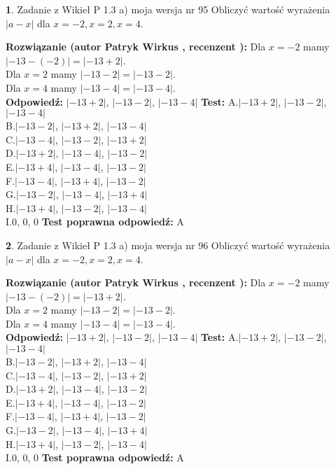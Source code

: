 \documentclass[12pt, a4paper]{article}
\theoremstyle{definition} %
\newtheorem{zad}{}
\newcommand{\zadStart}[1]{\begin{zad}#1\newline}
\newcommand{\zadStop}{\end{zad}}
\newcommand{\rozwStart}[2]{\noindent \textbf{Rozwiązanie (autor #1 , recenzent #2): }\newline}
\newcommand{\rozwStop}{\newline}
\newcommand{\odpStart}{\noindent \textbf{Odpowiedź:}\newline}
\newcommand{\odpStop}{\newline}
\newcommand{\testStart}{\noindent \textbf{Test:}\newline}
\newcommand{\testStop}{\newline}
\newcommand{\kluczStart}{\noindent \textbf{Test poprawna odpowiedź:}\newline}
\newcommand{\kluczStop}{\newline}
\begin{document}
\zadStart{Zadanie z Wikieł P 1.3 a) moja wersja nr 95}
Obliczyć wartość wyrażenia $|a - x|$ dla $x=-2,x=2,x=4$.
\zadStop
\rozwStart{Patryk Wirkus}{}
Dla $x = -2$ mamy $|-13 - (-2)| = |-13 + 2|$.\\
Dla $x = 2$ mamy $|-13 - 2| = |-13 - 2|$.\\
Dla $x = 4$ mamy $|-13 - 4| = |-13 - 4|$.\\
\rozwStop
\odpStart
$|-13 + 2|$, $|-13 - 2|$, $|-13 - 4|$
\odpStop
\testStart
A.$|-13 + 2|$, $|-13 - 2|$, $|-13 - 4|$\\
B.$|-13 - 2|$, $|-13 + 2|$, $|-13 - 4|$\\
C.$|-13 - 4|$, $|-13 - 2|$, $|-13 + 2|$\\
D.$|-13 + 2|$, $|-13 - 4|$, $|-13 - 2|$\\
E.$|-13 + 4|$, $|-13 - 4|$, $|-13 - 2|$\\
F.$|-13 - 4|$, $|-13 + 4|$, $|-13 - 2|$\\
G.$|-13 - 2|$, $|-13 - 4|$, $|-13 + 4|$\\
H.$|-13 + 4|$, $|-13 - 2|$, $|-13 - 4|$\\
I.$0$, $0$, $0$
\testStop
\kluczStart
A
\kluczStop



\zadStart{Zadanie z Wikieł P 1.3 a) moja wersja nr 96}
Obliczyć wartość wyrażenia $|a - x|$ dla $x=-2,x=2,x=4$.
\zadStop
\rozwStart{Patryk Wirkus}{}
Dla $x = -2$ mamy $|-13 - (-2)| = |-13 + 2|$.\\
Dla $x = 2$ mamy $|-13 - 2| = |-13 - 2|$.\\
Dla $x = 4$ mamy $|-13 - 4| = |-13 - 4|$.\\
\rozwStop
\odpStart
$|-13 + 2|$, $|-13 - 2|$, $|-13 - 4|$
\odpStop
\testStart
A.$|-13 + 2|$, $|-13 - 2|$, $|-13 - 4|$\\
B.$|-13 - 2|$, $|-13 + 2|$, $|-13 - 4|$\\
C.$|-13 - 4|$, $|-13 - 2|$, $|-13 + 2|$\\
D.$|-13 + 2|$, $|-13 - 4|$, $|-13 - 2|$\\
E.$|-13 + 4|$, $|-13 - 4|$, $|-13 - 2|$\\
F.$|-13 - 4|$, $|-13 + 4|$, $|-13 - 2|$\\
G.$|-13 - 2|$, $|-13 - 4|$, $|-13 + 4|$\\
H.$|-13 + 4|$, $|-13 - 2|$, $|-13 - 4|$\\
I.$0$, $0$, $0$
\testStop
\kluczStart
A
\kluczStop
\end{document}
